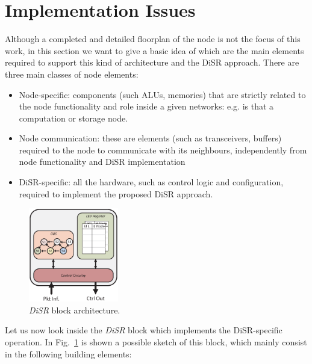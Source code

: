 
\section{Implementation Issues}
\label{sec:implementation}

Although a completed and detailed floorplan of the node is not the
focus of this work, in this section we want to give a basic idea of
which are the main elements required to support this kind of
architecture and the DiSR approach. There are three main classes of
node elements:
\begin{itemize}
\item Node-specific: components (such ALUs, memories) that are
strictly related to the node functionality and role inside a given
networks: e.g. is that a computation or storage node.
\item Node communication:  these are elements (such as transceivers,
buffers) required to the node to communicate with its neighbours,
independently from node functionality and DiSR implementation
\item DiSR-specific: all the hardware, such as control logic and
configuration, required to implement the proposed DiSR approach.
\end{itemize}


\begin{figure}
  \centering
  \includegraphics[width=0.35\textwidth]{pictures/disr_imp.eps}
  \caption{\emph{DiSR} block architecture.}
 \label{fig:implementation}
\end{figure}



Let us now look inside the \emph{DiSR} block which implements the DiSR-specific
operation. In Fig.~\ref{fig:implementation} is shown a possible sketch of this 
block, which mainly consist in the following building elements:

